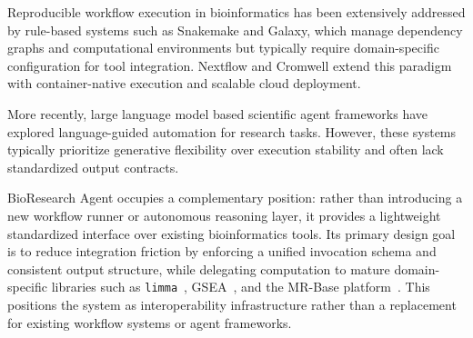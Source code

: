 Reproducible workflow execution in bioinformatics has been extensively addressed by rule-based systems such as Snakemake and Galaxy, which manage dependency graphs and computational environments but typically require domain-specific configuration for tool integration. Nextflow and Cromwell extend this paradigm with container-native execution and scalable cloud deployment.

More recently, large language model based scientific agent frameworks have explored language-guided automation for research tasks. However, these systems typically prioritize generative flexibility over execution stability and often lack standardized output contracts.

BioResearch Agent occupies a complementary position: rather than introducing a new workflow runner or autonomous reasoning layer, it provides a lightweight standardized interface over existing bioinformatics tools. Its primary design goal is to reduce integration friction by enforcing a unified invocation schema and consistent output structure, while delegating computation to mature domain-specific libraries such as \texttt{limma}~\cite{ritchie2015limma}, GSEA~\cite{subramanian2005gsea}, and the MR-Base platform~\cite{hemani2018mrbase}. This positions the system as interoperability infrastructure rather than a replacement for existing workflow systems or agent frameworks.
